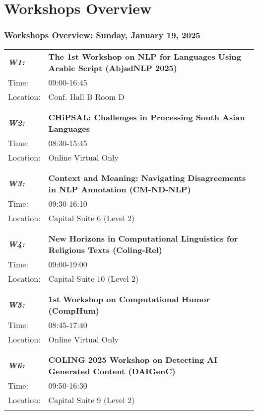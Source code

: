 \chapter{Workshops Overview}
\subsection{Workshops Overview: Sunday, January 19, 2025}
\begin{longtable}{p{15mm}p{100mm}}
\emph{\textbf{W1:}} & \textbf{The 1st Workshop on NLP for Languages Using Arabic Script (AbjadNLP 2025)} \\
Time: & 09:00-16:45 \\
Location: & Conf. Hall B Room D \\\\
\hline\\
\emph{\textbf{W2:}} & \textbf{CHiPSAL: Challenges in Processing South Asian Languages} \\
Time: & 08:30-15:45 \\
Location: & Online Virtual Only \\\\
\hline\\
\emph{\textbf{W3:}} & \textbf{Context and Meaning: Navigating Disagreements in NLP Annotation (CM-ND-NLP)} \\
Time: & 09:30-16:10 \\
Location: & Capital Suite 6 (Level 2) \\\\
\hline\\
\emph{\textbf{W4:}} & \textbf{New Horizons in Computational Linguistics for Religious Texts (Coling-Rel)} \\
Time: & 09:00-19:00 \\
Location: & Capital Suite 10 (Level 2) \\\\
\hline\\
\emph{\textbf{W5:}} & \textbf{1st Workshop on Computational Humor (CompHum)} \\
Time: & 08:45-17:40 \\
Location: & Online Virtual Only \\\\
\hline\\
\emph{\textbf{W6:}} & \textbf{COLING 2025 Workshop on Detecting AI Generated Content (DAIGenC)} \\
Time: & 09:50-16:30 \\
Location: & Capital Suite 9 (Level 2) \\\\

\end{longtable}
